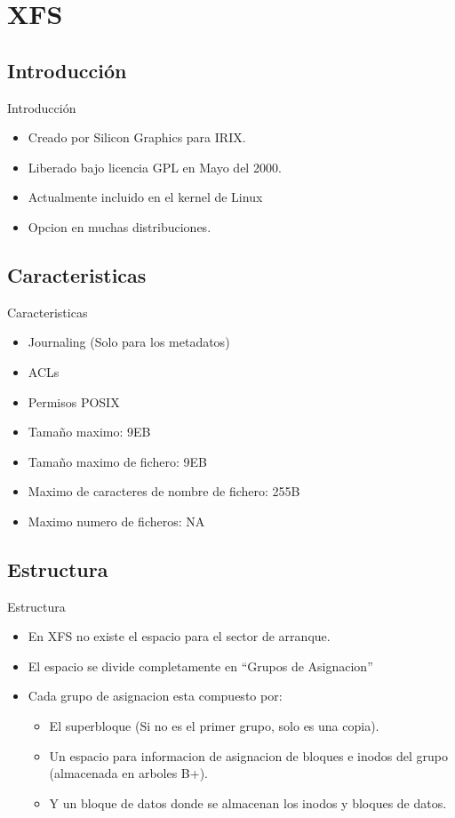 \section{XFS}
\subsection{Introducción}
\begin{frame}{Introducción}
  \begin{itemize}
    \item Creado por Silicon Graphics para IRIX.
    \item Liberado bajo licencia GPL en Mayo del 2000.
    \item Actualmente incluido en el kernel de Linux
    \item Opcion en muchas distribuciones.
  \end{itemize}
\end{frame}

\subsection{Caracteristicas}
\begin{frame}{Caracteristicas}
  \begin{itemize}
    \item Journaling (Solo para los metadatos)
    \item ACLs
    \item Permisos POSIX
    \item Tamaño maximo: 9EB
    \item Tamaño maximo de fichero: 9EB
    \item Maximo de caracteres de nombre de fichero: 255B
    \item Maximo numero de ficheros: NA
  \end{itemize}
\end{frame}

\subsection{Estructura}
\begin{frame}{Estructura}
  \begin{itemize}
    \item En XFS no existe el espacio para el sector de arranque.
    \item El espacio se divide completamente en “Grupos de Asignacion”
    \item Cada grupo de asignacion esta compuesto por:
    \begin{itemize}
      \item El superbloque (Si no es el primer grupo, solo es una copia).
      \item Un espacio para informacion de asignacion de bloques e inodos del grupo (almacenada en arboles B+).
      \item Y un bloque de datos donde se almacenan los inodos y bloques de datos.
    \end{itemize}
  \end{itemize}
\end{frame}

